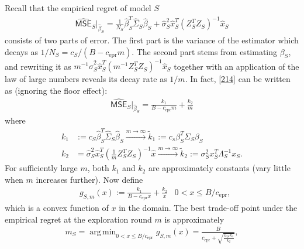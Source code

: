 \documentclass[a4paper,11pt]{article}
\numberwithin{equation}{section}
\theoremstyle{plain}
\theoremstyle{definition}
\def\ex{{\text{epr}}}
\def\mse{{\textsf{MSE}}}
\DeclareMathOperator*{\argmin}{arg\,min}
\begin{document}
Recall that the empirical regret of model $S$
\begin{align}
\widehat{\mse}_S|_{\widehat{\beta}_S} = \frac{1}{N_S}\widehat{\beta}_S^T\widehat{\Sigma}_S\widehat{\beta}_S + \widehat{\sigma}_S^2\widehat{x}_S^T(Z_S^TZ_S)^{-1}\widehat{x}_S\label{214}
\end{align}
consists of two parts of error. The first part is the variance of the estimator which decays as $1/N_S = c_S/(B-c_\ex m)$. 
The second part stems from estimating $\beta_S$, and rewriting it as $m^{-1}\widehat{\sigma}_S^2\widehat{x}_S^T(m^{-1}Z_S^TZ_S)^{-1}\widehat{x}_S$ together with an application of the law of large numbers reveals its decay rate as $1/m$. In fact, \eqref{214} can be written as (ignoring the floor effect):
\begin{align}
\widehat{\mse}_S|_{\widehat{\beta}_S} = \frac{k_1}{B-c_{\ex} m}+\frac{k_2}{m}
\end{align}
where 
\begin{align}
k_1 &:= c_S\widehat{\beta}_S^T\widehat{\Sigma}_S\widehat{\beta}_S\xrightarrow{m\to\infty} \tilde{k}_1:=c_s\beta_S^T\Sigma_S\beta_S\nonumber\\
k_2 &= \widehat{\sigma}_S^2\widehat{x}_S^T\left(\frac{1}{m}Z_S^TZ_S\right)^{-1}\widehat{x}\xrightarrow{m\to\infty} \tilde{k}_2:=\sigma_S^2x_S^T\Lambda_S^{-1}x_S.\label{///}
\end{align}
For sufficiently large $m$, both $k_1$ and $k_2$ are approximately constants (vary little when $m$ increases further). 
Now define 
\begin{align}
&g_{S,m}(x) :=  \frac{k_1}{B-c_{\ex} x}+\frac{k_2}{x}& 0< x\leq B/c_{\ex},
\end{align}
which is a convex function of $x$ in the domain.  
The best trade-off point under the empirical regret at the exploration round $m$ is approximately
\begin{align}
m_S = \argmin_{0< x\leq B/c_{\ex}}g_{S,m}(x) = \frac{B}{c_{\ex}+\sqrt{\frac{c_{\ex}k_1}{k_2}}},\label{m_S}
\end{align}
\end{document}
